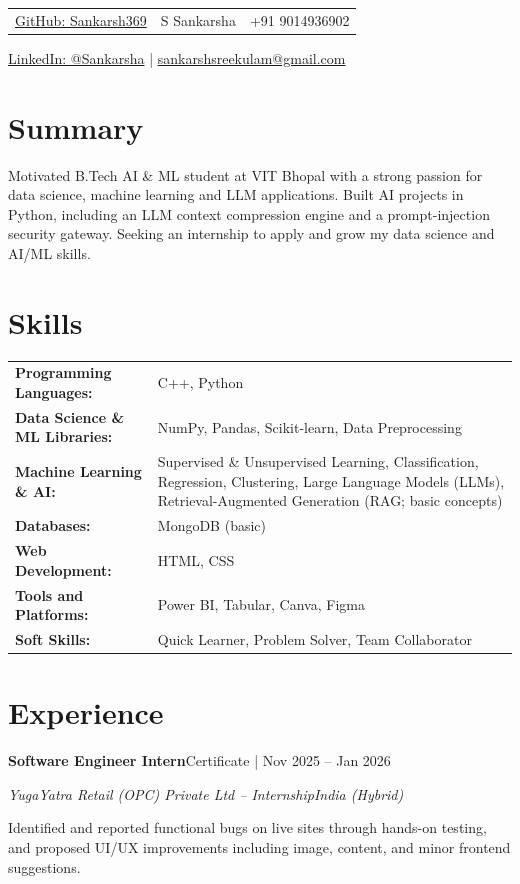 \documentclass[10pt,letterpaper]{article}
\newcommand{\projecthead}[2]{%
  \noindent\textbf{#1}\hfill#2\par\vspace{1pt}}
\begin{document}
\noindent
\begin{tabularx}{\linewidth}{@{}X c X@{}}
  \small \href{https://github.com/Sankarsh369}{GitHub: Sankarsh369} &
  {\LARGE S Sankarsha} &
  \small \hfill +91 9014936902 \\
\end{tabularx}
\begin{center}
\small \href{https://www.linkedin.com/in/Sankarsha}{LinkedIn: @Sankarsha} \quad|\quad
\href{mailto:sankarshsreekulam@gmail.com}{sankarshsreekulam@gmail.com}
\end{center}

\section{Summary}
Motivated B.Tech AI \& ML student at VIT Bhopal with a strong passion for data science, machine learning and
LLM applications. Built AI projects in Python, including an LLM context compression engine and a prompt-injection
security gateway. Seeking an internship to apply and grow my data science and AI/ML skills.

\section{Skills}
\begin{tabularx}{\linewidth}{@{}>{\bfseries}l X@{}}
  Programming Languages: & C++, Python \\[2pt]
  Data Science \& ML Libraries: & NumPy, Pandas, Scikit-learn, Data Preprocessing \\[2pt]
  Machine Learning \& AI: & Supervised \& Unsupervised Learning, Classification, Regression, Clustering, Large Language Models (LLMs), Retrieval-Augmented Generation (RAG; basic concepts) \\[2pt]
  Databases: & MongoDB (basic) \\[2pt]
  Web Development: & HTML, CSS \\[2pt]
  Tools and Platforms: & Power BI, Tabular, Canva, Figma \\[2pt]
  Soft Skills: & Quick Learner, Problem Solver, Team Collaborator \\
\end{tabularx}

\section{Experience}
\projecthead{\textbf{Software Engineer Intern}}{Certificate | Nov 2025 -- Jan 2026}
\noindent\textit{YugaYatra Retail (OPC) Private Ltd -- Internship}\hfill\textit{India (Hybrid)}\par
\vspace{2pt}
Identified and reported functional bugs on live sites through hands-on testing, and proposed UI/UX improvements
including image, content, and minor frontend suggestions.
\end{document}
